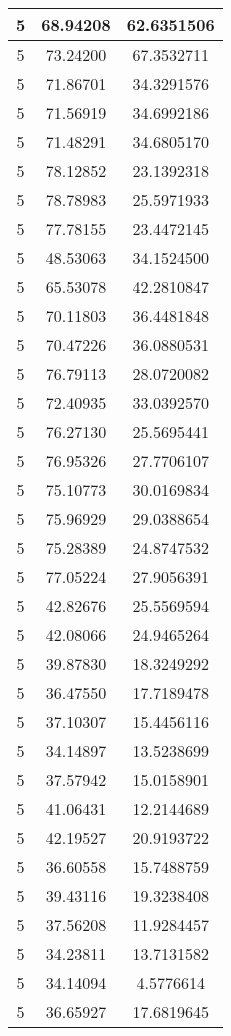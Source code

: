 \documentclass[
]{book}
\begin{document}
\begin{tabular}{c|c|c}
\hline
5 & 68.94208 & 62.6351506\\
\hline
5 & 73.24200 & 67.3532711\\
\hline
5 & 71.86701 & 34.3291576\\
\hline
5 & 71.56919 & 34.6992186\\
\hline
5 & 71.48291 & 34.6805170\\
\hline
5 & 78.12852 & 23.1392318\\
\hline
5 & 78.78983 & 25.5971933\\
\hline
5 & 77.78155 & 23.4472145\\
\hline
5 & 48.53063 & 34.1524500\\
\hline
5 & 65.53078 & 42.2810847\\
\hline
5 & 70.11803 & 36.4481848\\
\hline
5 & 70.47226 & 36.0880531\\
\hline
5 & 76.79113 & 28.0720082\\
\hline
5 & 72.40935 & 33.0392570\\
\hline
5 & 76.27130 & 25.5695441\\
\hline
5 & 76.95326 & 27.7706107\\
\hline
5 & 75.10773 & 30.0169834\\
\hline
5 & 75.96929 & 29.0388654\\
\hline
5 & 75.28389 & 24.8747532\\
\hline
5 & 77.05224 & 27.9056391\\
\hline
5 & 42.82676 & 25.5569594\\
\hline
5 & 42.08066 & 24.9465264\\
\hline
5 & 39.87830 & 18.3249292\\
\hline
5 & 36.47550 & 17.7189478\\
\hline
5 & 37.10307 & 15.4456116\\
\hline
5 & 34.14897 & 13.5238699\\
\hline
5 & 37.57942 & 15.0158901\\
\hline
5 & 41.06431 & 12.2144689\\
\hline
5 & 42.19527 & 20.9193722\\
\hline
5 & 36.60558 & 15.7488759\\
\hline
5 & 39.43116 & 19.3238408\\
\hline
5 & 37.56208 & 11.9284457\\
\hline
5 & 34.23811 & 13.7131582\\
\hline
5 & 34.14094 & 4.5776614\\
\hline
5 & 36.65927 & 17.6819645\\

\end{tabular}
\end{document}
